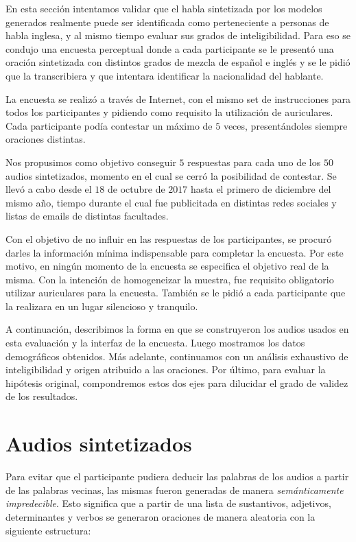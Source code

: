 
En esta sección intentamos validar que el habla sintetizada por los modelos generados realmente puede ser identificada como perteneciente a personas de habla inglesa, y al mismo tiempo evaluar sus grados de inteligibilidad. Para eso se condujo una encuesta perceptual donde a cada participante se le presentó una oración sintetizada con distintos grados de mezcla de español e inglés y se le pidió que la transcribiera y que intentara identificar la nacionalidad del hablante. 

La encuesta se realizó a través de Internet, con el mismo set de instrucciones para todos los participantes y pidiendo como requisito la utilización de auriculares. Cada participante podía contestar un máximo de $5$ veces, presentándoles siempre oraciones distintas.

Nos propusimos como objetivo conseguir $5$ respuestas para cada uno de los $50$ audios sintetizados, momento en el cual se cerró la posibilidad de contestar. Se llevó a cabo desde el $18$ de octubre de $2017$ hasta el primero de diciembre del mismo año, tiempo durante el cual fue publicitada en distintas redes sociales y listas de emails de distintas facultades.

Con el objetivo de no influir en las respuestas de los participantes, se procuró darles la información mínima indispensable para completar la encuesta. Por este motivo, en ningún momento de la encuesta se especifica el objetivo real de la misma. Con la intención de homogeneizar la muestra, fue requisito obligatorio utilizar auriculares para la encuesta. También se le pidió a cada participante que la realizara en un lugar silencioso y tranquilo.

A continuación, describimos la forma en que se construyeron los audios usados en esta evaluación y la interfaz de la encuesta. Luego mostramos los datos demográficos  obtenidos. Más adelante, continuamos con un análisis exhaustivo de inteligibilidad y origen atribuido a las oraciones.
Por último, para evaluar la hipótesis original, compondremos estos dos ejes para dilucidar el grado de validez de los resultados.

\section{Audios sintetizados}

Para evitar que el participante pudiera deducir las palabras de los audios a partir de las palabras vecinas, las mismas fueron generadas de manera \textit{semánticamente impredecible}. Esto significa que a partir de una lista de sustantivos, adjetivos, determinantes y verbos se generaron oraciones de manera aleatoria con la siguiente estructura:

